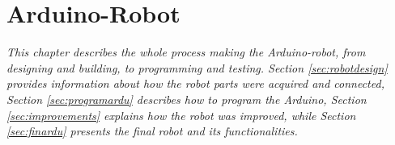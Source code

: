 \chapter{Arduino-Robot}
\textit{This chapter describes the whole process making the Arduino-robot, from designing and building, to programming and testing. Section \ref{sec:robotdesign} provides information about how the robot parts were acquired and connected, Section \ref{sec:programardu} describes how to program the Arduino, Section \ref{sec:improvements} explains how the robot was improved, while Section \ref{sec:finardu} presents the final robot and its functionalities.}



